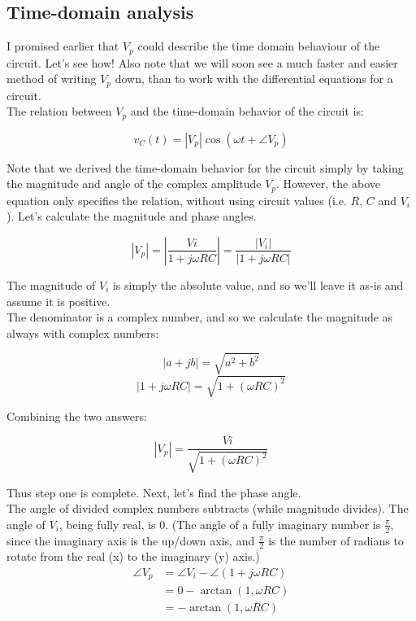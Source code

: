 \documentclass[12pt,a4paper]{report}
\begin{document}
\subsection{Time-domain analysis}

I promised earlier that $V_p$ could describe the time domain behaviour of the circuit. Let's see how! Also note that we will soon see a much faster and easier method of writing $V_p$ down, than to work with the differential equations for a circuit.\\

The relation between $V_p$ and the time-domain behavior of the circuit is:

\[ v_C(t) = \left| V_p \right| \cos{(\omega t + \angle V_p)} \]

Note that we derived the time-domain behavior for the circuit simply by taking the magnitude and angle of the complex amplitude $V_p$. However, the above equation only specifies the relation, without using circuit values (i.e. $R$, $C$ and $V_i$). Let's calculate the magnitude and phase angles.

\[ | V_p | = \left| \frac{Vi}{1 + j \omega RC} \right| = \frac{|V_i|}{|1 + j \omega RC|} \]

The magnitude of $V_i$ is simply the absolute value, and so we'll leave it as-is and assume it is positive.\\
The denominator is a complex number, and so we calculate the magnitude as always with complex numbers:

\[ |a + jb| = \sqrt{a^2 + b^2} \]
\[ |1 + j \omega R C| = \sqrt{1 + (\omega R C)^2} \]

Combining the two answers:

\[ |V_p| = \frac{Vi}{\sqrt{1 + (\omega R C)^2}} \]

Thus step one is complete. Next, let's find the phase angle.\\
The angle of divided complex numbers subtracts (while magnitude divides). The angle of $V_i$, being fully real, is 0. (The angle of a fully imaginary number is $\displaystyle \frac{\pi}{2}$, since the imaginary axis is the up/down axis, and $\displaystyle \frac{\pi}{2}$ is the number of radians to rotate from the real (x) to the imaginary (y) axis.)\\

\begin{align*}
  \angle V_p &= \angle V_i - \angle (1 + j \omega R C) \\ 
  &= 0 - \arctan{(1, \omega R C)} \\
  &= -\arctan{(1, \omega R C)}
\end{align*}
\end{document}
